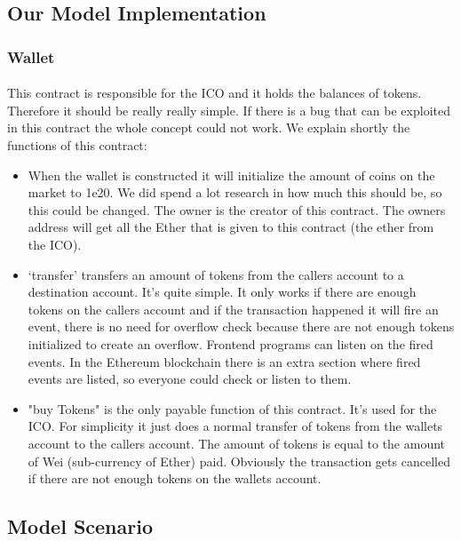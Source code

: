 \documentclass{scrartcl}
\begin{document}
	\subsection{Our Model Implementation}
	
	\subsubsection{Wallet}
	
	\paragraph{}
	This contract is responsible for the ICO and it holds the balances of tokens. Therefore it should be really really simple. If there is a bug that can be exploited in this contract the whole concept could not work. We explain shortly the functions of this contract:
	
	\begin{itemize}
		\item When the wallet is constructed it will initialize the amount of coins on the market to 1e20. We did spend a lot research in how much this should be, so this could be changed. The owner is the creator of this contract. The owners address will get all the Ether that is given to this contract (the ether from the ICO).
		\item ‘transfer’ transfers an amount of tokens from the callers account to a destination account. It’s quite simple. It only works if there are enough tokens on the callers account and if the transaction happened it will fire an event, there is no need for overflow check because there are not enough tokens initialized to create an overflow. Frontend programs can listen on the fired events. In the Ethereum blockchain there is an extra section where fired events are listed, so everyone could check or listen to them.
		\item "buy Tokens" is the only payable function of this contract. It’s used for the ICO. For simplicity it just does a normal transfer of tokens from the wallets account to the callers account. The amount of tokens is equal to the amount of Wei (sub-currency of Ether) paid. Obviously the transaction gets cancelled if there are not enough tokens on the wallets account.
	\end{itemize}
		
	\subsection{Model Scenario}
	
\end{document}
